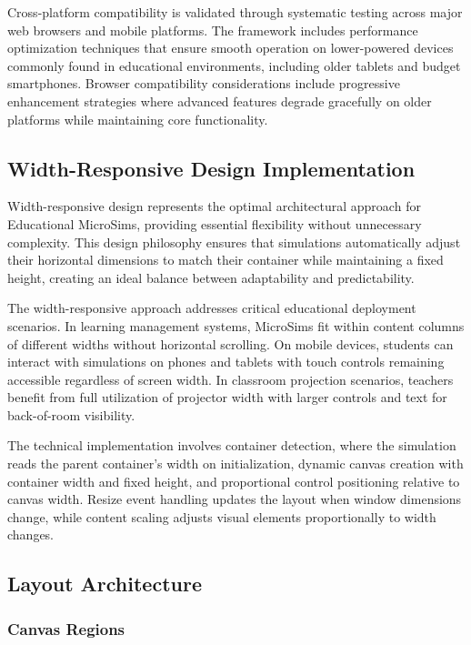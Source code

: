 Cross-platform compatibility is validated through systematic testing across major web browsers and mobile platforms. The framework includes performance optimization techniques that ensure smooth operation on lower-powered devices commonly found in educational environments, including older tablets and budget smartphones. Browser compatibility considerations include progressive enhancement strategies where advanced features degrade gracefully on older platforms while maintaining core functionality.

\subsection{Width-Responsive Design Implementation}

Width-responsive design represents the optimal architectural approach for Educational MicroSims, providing essential flexibility without unnecessary complexity. This design philosophy ensures that simulations automatically adjust their horizontal dimensions to match their container while maintaining a fixed height, creating an ideal balance between adaptability and predictability.

The width-responsive approach addresses critical educational deployment scenarios. In learning management systems, MicroSims fit within content columns of different widths without horizontal scrolling. On mobile devices, students can interact with simulations on phones and tablets with touch controls remaining accessible regardless of screen width. In classroom projection scenarios, teachers benefit from full utilization of projector width with larger controls and text for back-of-room visibility.

The technical implementation involves container detection, where the simulation reads the parent container's width on initialization, dynamic canvas creation with container width and fixed height, and proportional control positioning relative to canvas width. Resize event handling updates the layout when window dimensions change, while content scaling adjusts visual elements proportionally to width changes.

\subsection{Layout Architecture}

\subsubsection{Canvas Regions}

